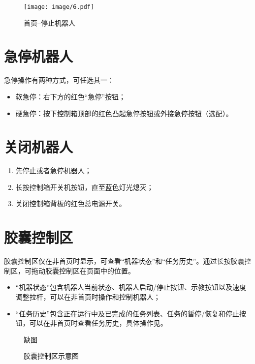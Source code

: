 \begin{figure}[ht]
	\centering
	\texttt{[image: image/6.pdf]}
	\caption{\LM  首页--停止机器人}
	\label{fig:停止机器人}
\end{figure}

\section{急停机器人}

急停操作有两种方式，可任选其一：
\begin{itemize}
	\item 软急停：\LM 右下方的红色“急停”按钮；
	\item 硬急停：按下控制箱顶部的红色凸起急停按钮或外接急停按钮（选配）。
\end{itemize}


\section{关闭机器人}
\begin{enumerate}
	\item 先停止或者急停机器人；
	\item 长按控制箱开关机按钮，直至蓝色灯光熄灭；
	\item 关闭控制箱背板的红色总电源开关。
\end{enumerate}


\section{胶囊控制区}
胶囊控制区仅在非首页时显示，可查看“机器状态”和“任务历史”。通过长按胶囊控制区，可拖动胶囊控制区在页面中的位置。
\begin{itemize}
	\item “机器状态”包含机器人当前状态、机器人启动/停止按钮、示教按钮以及速度调整拉杆，可以在非首页时操作和控制机器人；
	\item “任务历史”包含正在运行中及已完成的任务列表、任务的暂停/恢复和停止按钮，可以在非首页时查看任务历史，具体操作见。
\end{itemize}

\begin{figure}[ht]
	\centering
	\color{red}缺图
	\caption{胶囊控制区示意图}
	\label{fig:胶囊控制区示意图}
\end{figure}
